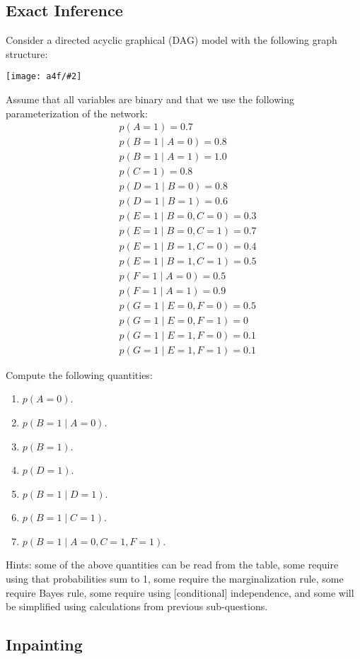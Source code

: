 \documentclass{article}
\def\blu#1{{\color{blu}#1}}
\def\cond{\; | \;}
\newcommand{\centerfig}[2]{\begin{center}\texttt{[image: a4f/\#2]}\end{center}}
\def\enum#1{\begin{enumerate}#1\end{enumerate}}
\begin{document}
\subsection{Exact Inference}

Consider a  directed acyclic graphical (DAG) model with the following graph structure:
\centerfig{.4}{DAG2}
Assume that all variables are binary and that we use the following parameterization of the network:
\begin{align*}
& p(A = 1) = 0.7\\
& p(B = 1 \cond A = 0) = 0.8\\
& p(B = 1 \cond A = 1) = 1.0\\
& p(C = 1) = 0.8\\
& p(D = 1 \cond B = 0) = 0.8\\
& p(D = 1 \cond B = 1) = 0.6\\
& p(E = 1 \cond B = 0, C = 0) = 0.3\\
& p(E = 1 \cond B = 0, C = 1) = 0.7\\
& p(E = 1 \cond B = 1, C = 0) = 0.4\\
& p(E = 1 \cond B = 1, C = 1) = 0.5\\
& p(F = 1 \cond A = 0) = 0.5\\
& p(F = 1 \cond A = 1) = 0.9\\
& p(G = 1 \cond E = 0, F = 0) = 0.5\\
& p(G = 1 \cond E = 0, F = 1) = 0\\
& p(G = 1 \cond E = 1, F = 0) = 0.1\\
& p(G = 1 \cond E = 1, F = 1) = 0.1
\end{align*}


\blu{Compute the following quantities}:
\enum{
\item $p(A = 0)$.
\item $p(B = 1 \cond A = 0)$.
\item $p(B = 1)$.
\item $p(D = 1)$.
\item $p(B = 1 \cond D = 1)$.
\item $p(B = 1 \cond C = 1)$.
\item $p(B = 1 \cond A = 0, C = 1, F = 1)$.
}
Hints: some of the above quantities can be read from the table, some require using that probabilities sum to 1, some require the marginalization rule, some require Bayes rule, some require using [conditional] independence, and some will be simplified using calculations from previous sub-questions.


\subsection{Inpainting}
\end{document}

